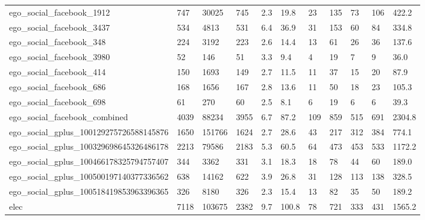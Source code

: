 \begin{longtable}{lllllllllll}
 ego\_social\_facebook\_1912                           & 747        & 30025     & 745   & 2.3    & 19.8   & 23    & 135    & 73     & 106    & 422.2   \\
 ego\_social\_facebook\_3437                           & 534        & 4813      & 531   & 6.4    & 36.9   & 31    & 153    & 60     & 84     & 334.8   \\
 ego\_social\_facebook\_348                            & 224        & 3192      & 223   & 2.6    & 14.4   & 13    & 61     & 26     & 36     & 137.6   \\
 ego\_social\_facebook\_3980                           & 52         & 146       & 51    & 3.3    & 9.4    & 4     & 19     & 7      & 9      & 36.0    \\
 ego\_social\_facebook\_414                            & 150        & 1693      & 149   & 2.7    & 11.5   & 11    & 37     & 15     & 20     & 87.9    \\
 ego\_social\_facebook\_686                            & 168        & 1656      & 167   & 2.8    & 13.6   & 11    & 50     & 18     & 23     & 105.3   \\
 ego\_social\_facebook\_698                            & 61         & 270       & 60    & 2.5    & 8.1    & 6     & 19     & 6      & 6      & 39.3    \\
 ego\_social\_facebook\_combined                       & 4039       & 88234     & 3955  & 6.7    & 87.2   & 109   & 859    & 515    & 691    & 2304.8  \\
 ego\_social\_gplus\_100129275726588145876             & 1650       & 151766    & 1624  & 2.7    & 28.6   & 43    & 217    & 312    & 384    & 774.1   \\
 ego\_social\_gplus\_100329698645326486178             & 2213       & 79586     & 2183  & 5.3    & 60.5   & 64    & 473    & 453    & 533    & 1172.2  \\
 ego\_social\_gplus\_100466178325794757407             & 344        & 3362      & 331   & 3.1    & 18.3   & 18    & 78     & 44     & 60     & 189.0   \\
 ego\_social\_gplus\_100500197140377336562             & 638        & 14162     & 622   & 3.9    & 26.8   & 31    & 128    & 113    & 138    & 328.5   \\
 ego\_social\_gplus\_100518419853963396365             & 326        & 8180      & 326   & 2.3    & 15.4   & 13    & 82     & 35     & 50     & 189.2   \\
 elec                                               & 7118       & 103675    & 2382  & 9.7    & 100.8  & 78    & 721    & 333    & 431    & 1565.2  \\

\end{longtable}

